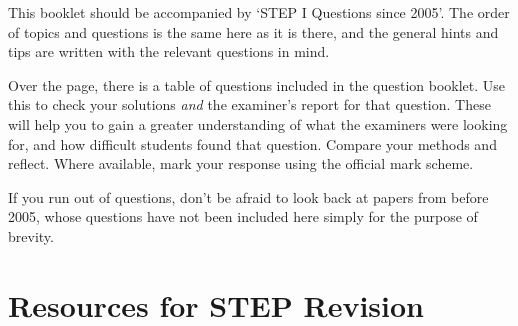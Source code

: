 \documentclass[9pt]{extarticle}
\begin{document}
	This booklet should be accompanied by `STEP I Questions since 2005'. The order of topics and questions is the same here as it is there, and the general hints and tips are written with the relevant questions in mind.
	
	Over the page, there is a table of questions included in the question booklet. Use this to check your solutions \emph{and} the examiner's report for that question. These will help you to gain a greater understanding of what the examiners were looking for, and how difficult students found that question. Compare your methods and reflect. Where available, mark your response using the official mark scheme.
	
	If you run out of questions, don't be afraid to look back at papers from before 2005, whose questions have not been included here simply for the purpose of brevity.
	
	\section*{Resources for STEP Revision}
	
	\thispagestyle{empty}
	
\end{document}
